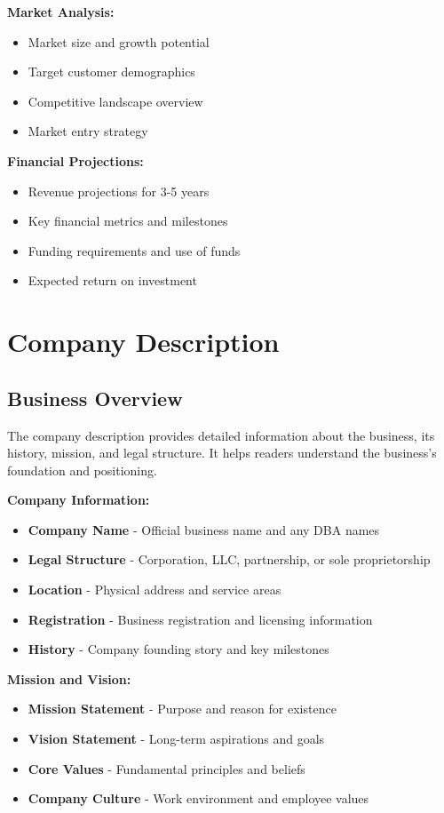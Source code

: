 \documentclass[12pt]{article}
\begin{document}
\textbf{Market Analysis:}
\begin{itemize}
    \item Market size and growth potential
    \item Target customer demographics
    \item Competitive landscape overview
    \item Market entry strategy
\end{itemize}

\textbf{Financial Projections:}
\begin{itemize}
    \item Revenue projections for 3-5 years
    \item Key financial metrics and milestones
    \item Funding requirements and use of funds
    \item Expected return on investment
\end{itemize}

\section{Company Description}

\subsection{Business Overview}
The company description provides detailed information about the business, its history, mission, and legal structure. It helps readers understand the business's foundation and positioning.

\textbf{Company Information:}
\begin{itemize}
    \item \textbf{Company Name} - Official business name and any DBA names
    \item \textbf{Legal Structure} - Corporation, LLC, partnership, or sole proprietorship
    \item \textbf{Location} - Physical address and service areas
    \item \textbf{Registration} - Business registration and licensing information
    \item \textbf{History} - Company founding story and key milestones
\end{itemize}

\textbf{Mission and Vision:}
\begin{itemize}
    \item \textbf{Mission Statement} - Purpose and reason for existence
    \item \textbf{Vision Statement} - Long-term aspirations and goals
    \item \textbf{Core Values} - Fundamental principles and beliefs
    \item \textbf{Company Culture} - Work environment and employee values
\end{itemize}
\end{document}

